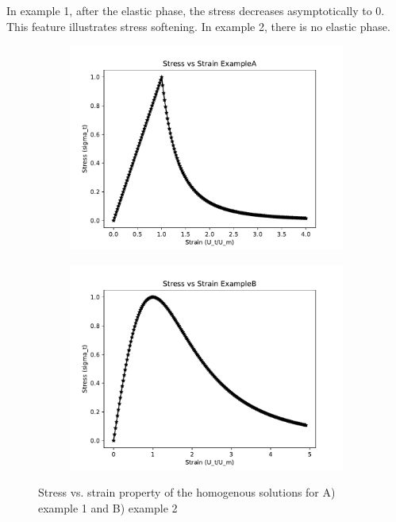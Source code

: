 \documentclass[12pt,3p]{article}
\numberwithin{equation}{section}
\begin{document}
In example 1, after the elastic phase, the stress decreases asymptotically to 0. This feature illustrates stress softening. In example 2, there is no elastic phase. 
\begin{figure}[h]
    \centering
    \begin{subfigure}[b]{0.45\textwidth}
        \includegraphics[width=\textwidth]{Images/A_stress_strain_dim.pdf}
    \end{subfigure}
    \quad %
    \begin{subfigure}[b]{0.43\textwidth}
        \includegraphics[width=\textwidth]{Images/B_stress_strain_dim.pdf}
    \end{subfigure}
    \caption{Stress vs. strain property of the homogenous solutions for A) example 1 and B) example 2}
\end{figure}
\end{document}
